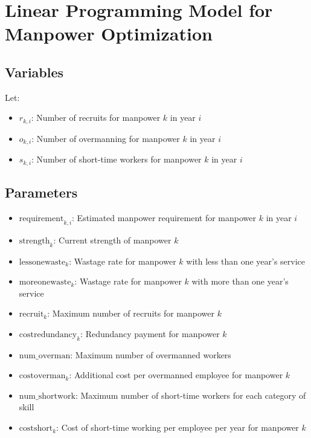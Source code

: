\documentclass{article}
\begin{document}
\section*{Linear Programming Model for Manpower Optimization}

\subsection*{Variables}

Let:
\begin{itemize}
    \item \( r_{k,i} \): Number of recruits for manpower \( k \) in year \( i \)
    \item \( o_{k,i} \): Number of overmanning for manpower \( k \) in year \( i \)
    \item \( s_{k,i} \): Number of short-time workers for manpower \( k \) in year \( i \)
\end{itemize}

\subsection*{Parameters}

\begin{itemize}
    \item \( \text{requirement}_{k,i} \): Estimated manpower requirement for manpower \( k \) in year \( i \)
    \item \( \text{strength}_{k} \): Current strength of manpower \( k \)
    \item \( \text{lessonewaste}_{k} \): Wastage rate for manpower \( k \) with less than one year's service
    \item \( \text{moreonewaste}_{k} \): Wastage rate for manpower \( k \) with more than one year's service
    \item \( \text{recruit}_{k} \): Maximum number of recruits for manpower \( k \)
    \item \( \text{costredundancy}_{k} \): Redundancy payment for manpower \( k \)
    \item \( \text{num\_overman} \): Maximum number of overmanned workers
    \item \( \text{costoverman}_{k} \): Additional cost per overmanned employee for manpower \( k \)
    \item \( \text{num\_shortwork} \): Maximum number of short-time workers for each category of skill
    \item \( \text{costshort}_{k} \): Cost of short-time working per employee per year for manpower \( k \)
\end{itemize}
\end{document}
